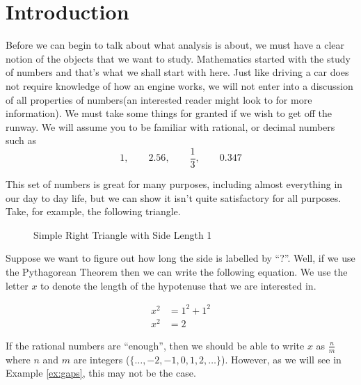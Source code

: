 
\section{Introduction}
Before we can begin to talk about what analysis is about, we must have a clear
notion of the objects that we want to study. Mathematics started with the study
of numbers and that's what we shall start with here. Just like driving a car
does not require knowledge of how an engine works, we will not enter into a
discussion of all properties of numbers(an interested reader might look to
 for more information). We
must take some things for granted if we wish to get off the runway. We will
assume you to be familiar with rational, or decimal numbers such as
\begin{equation}\label{eq:numbers}
1, \qquad 2.56, \qquad \frac{1}{3}, \qquad 0.347
\end{equation}

This set of numbers is great for many purposes, including almost everything in
our day to day life, but we can show it isn't quite satisfactory for all
purposes. Take, for example, the following triangle.

\begin{figure}\label{fig:right-triangle}
    \centering
    \caption{Simple Right Triangle with Side Length 1}
\end{figure}

Suppose we want to figure out how long the side is labelled by ``?''. Well, if
we use the Pythagorean Theorem then we can write the following
equation. We use the letter $x$ to denote the length of the hypotenuse that we
are interested in. 

\begin{align}
    x^2 & = 1^2 + 1^2 \nonumber \\
    x^2 & = 2 \label{eq:sqrt2}
\end{align}

If the rational numbers are ``enough'', then we should be able to write $x$
as $\frac{n}{m}$ where $n$ and $m$ are integers ({$\{\ldots, -2, -1,
0, 1, 2, \ldots\}$}).
However, as we will see in Example \ref{ex:gaps}, this may not be the case.

